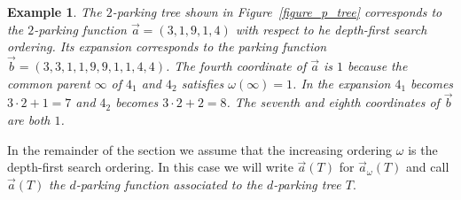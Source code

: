 \documentclass[11pt]{amsart}
\newtheorem{example}[theorem]{Example}
\numberwithin{equation}{section}
\begin{document}
\begin{example}
{\rm The $2$-parking tree shown in Figure~\ref{figure_p_tree}
corresponds to the $2$-parking function $\vec{a}=(3,1,9,1,4)$ with respect to he
depth-first search ordering. Its expansion corresponds to the parking
function $\vec{b}=(3,3,1,1,9,9,1,1,4,4)$. The fourth coordinate of
$\vec{a}$ is $1$ because the common parent $\infty$ of $4_{1}$ and $4_{2}$
satisfies $\omega(\infty)=1$. In the expansion $4_{1}$ becomes $3\cdot
2+1=7$ and $4_{2}$ becomes $3\cdot 2+2=8$. The seventh and eighth
coordinates of $\vec{b}$ are both $1$.}
\end{example}

In the remainder of the section we assume that
the increasing ordering $\omega$ is the depth-first search ordering.
In this case we will write 
$\vec{a}(T)$ for $\vec{a}_{\omega}(T)$
and call $\vec{a}(T)$
{\em the $d$-parking function associated to the $d$-parking tree $T$}.   
\end{document}
